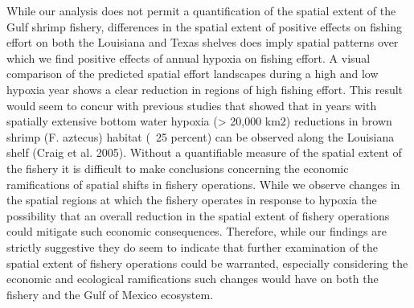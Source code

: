 \documentclass[10pt]{article}
\begin{document}
While our analysis does not permit a quantification of the spatial extent of the Gulf shrimp fishery, differences in the spatial extent of positive effects on fishing effort on both the Louisiana and Texas shelves does imply spatial patterns over which we find positive effects of annual hypoxia on fishing effort.  A visual comparison of the predicted spatial effort landscapes during a high and low hypoxia year shows a clear reduction in regions of high fishing effort.  This result would seem to concur with previous studies that showed that in years with spatially extensive bottom water hypoxia (> 20,000 km2) reductions in brown shrimp (F. aztecus) habitat (~25 percent) can be observed along the Louisiana shelf (Craig et al. 2005).  Without a quantifiable measure of the spatial extent of the fishery it is difficult to make conclusions concerning the economic ramifications of spatial shifts in fishery operations.  While we observe changes in the spatial regions at which the fishery operates in response to hypoxia the possibility that an overall reduction in the spatial extent of fishery operations could mitigate such economic consequences.  Therefore, while our findings are strictly suggestive they do seem to indicate that further examination of the spatial extent of fishery operations could be warranted, especially considering the economic and ecological ramifications such changes would have on both the fishery and the Gulf of Mexico ecosystem.  
\end{document}
